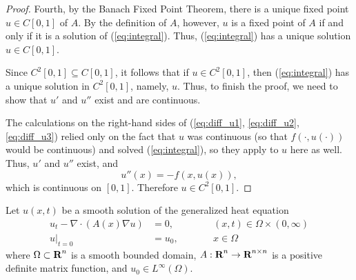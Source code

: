 \documentclass{homework}
\begin{document}
\begin{enumerate}[label=\textbf{(\roman*)}]
\begin{proof}
			Fourth, by the Banach Fixed Point Theorem, there is a unique fixed point $u \in C[0,1]$ of $A$. By the definition of $A$, however, $u$ is a fixed point of $A$ if and only if it is a solution of (\ref{eq:integral}). Thus, (\ref{eq:integral}) has a unique solution $u \in C[0,1]$. 
			
			Since $C^2[0,1] \subseteq C[0,1]$, it follows that if $u \in C^2[0,1]$, then (\ref{eq:integral}) has a unique solution in $C^2[0,1]$, namely, $u$. Thus, to finish the proof, we need to show that $u'$ and $u''$ exist and are continuous.
			
			The calculations on the right-hand sides of (\ref{eq:diff_u1}, \ref{eq:diff_u2}, \ref{eq:diff_u3}) relied only on the fact that $u$ was continuous (so that $f(\cdot, u(\cdot))$ would be continuous) and solved (\ref{eq:integral}), so they apply to $u$ here as well. Thus, $u'$ and $u''$ exist, and
			\begin{equation}
				u''(x) = -f(x, u(x)),
			\end{equation}
			which is continuous on $[0,1]$. Therefore $u \in C^2[0,1]$.
		\end{proof}
	\end{enumerate}
	
	\question Let $u(x,t)$ be a smooth solution of the generalized heat equation
	\begin{equation}
		\label{eq:generalized_heat}
		\begin{aligned}
			u_t - \nabla \cdot (A(x) \nabla u) &= 0,& &\qquad (x,t) \in \Omega\times(0,\infty) \\
			u \big\vert_{t=0} &= u_0,& &\qquad x \in \Omega
		\end{aligned}
	\end{equation}
	where $\Omega \subset \textbf{R}^n$ is a smooth bounded domain, $A : \textbf{R}^n \to \textbf{R}^{n\times n}$ is a positive definite matrix function, and $u_0 \in L^\infty(\Omega)$.
	
\end{document}
